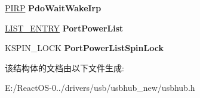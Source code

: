 \begin{DoxyCompactItemize}
\item 
\mbox{\label{struct___u_s_b_h_u_b___p_o_r_t___p_d_o___e_x_t_e_n_s_i_o_n_aabed1e8d4bf2f5edcd797c14651480f9}} 
\hyperlink{interfacevoid}{P\+I\+RP} {\bfseries Pdo\+Wait\+Wake\+Irp}
\item 
\mbox{\label{struct___u_s_b_h_u_b___p_o_r_t___p_d_o___e_x_t_e_n_s_i_o_n_a1d8a02ae2d1e31af2980b2e96cfa2732}} 
\hyperlink{struct___l_i_s_t___e_n_t_r_y}{L\+I\+S\+T\+\_\+\+E\+N\+T\+RY} {\bfseries Port\+Power\+List}
\item 
\mbox{\label{struct___u_s_b_h_u_b___p_o_r_t___p_d_o___e_x_t_e_n_s_i_o_n_a54ffd67b11e2a677a6a0b021ff28e723}} 
K\+S\+P\+I\+N\+\_\+\+L\+O\+CK {\bfseries Port\+Power\+List\+Spin\+Lock}
\end{DoxyCompactItemize}


该结构体的文档由以下文件生成\+:\begin{DoxyCompactItemize}
\item 
E\+:/\+React\+O\+S-\/0../drivers/usb/usbhub\+\_\+new/usbhub.\+h\end{DoxyCompactItemize}
